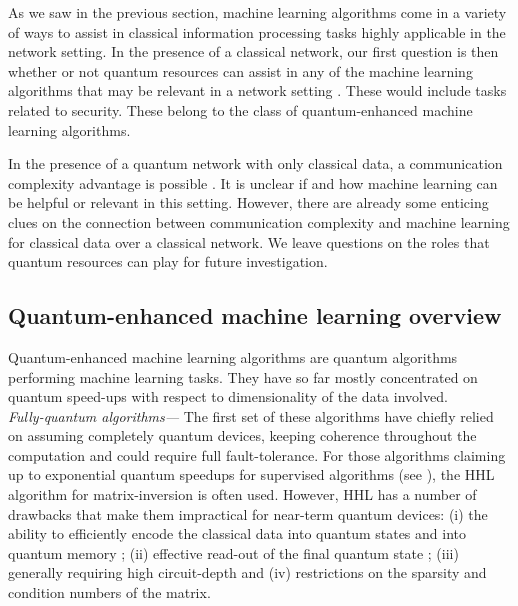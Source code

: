 \documentclass[twocolumn, aps, rmp, amsmath, amssymb, nofootinbib, superscriptaddress, longbibliography, floatfix, table-of-contents, eqsecnum]{revtex4-2}
\begin{document}
As we saw in the previous section, machine learning algorithms come in a variety of ways to assist in classical information processing tasks highly applicable in the network setting. In the presence of a classical network, our first question is then whether or not quantum resources can assist in any of the machine learning algorithms that may be relevant in a network setting . These would include tasks related to security. These belong to the class of quantum-enhanced machine learning algorithms.

In the presence of a quantum network with only classical data, a communication complexity advantage is possible \cite{brassard2003quantum}. It is unclear if and how machine learning can be helpful or relevant in this setting. However, there are already some enticing clues \cite{kane2017communication, balcan2012distributed, conitzer2004communication} on the connection between communication complexity and machine learning for classical data over a classical network. We leave questions on the roles that quantum resources can play for future investigation. 

\subsection{Quantum-enhanced machine learning overview}
Quantum-enhanced machine learning algorithms are quantum algorithms performing machine learning tasks. They have so far mostly concentrated on quantum speed-ups with respect to dimensionality of the data involved. \\

\textit{Fully-quantum algorithms---} The first set of these algorithms have chiefly relied on assuming completely quantum devices, keeping coherence throughout the computation and could require full fault-tolerance. For those algorithms claiming up to exponential quantum speedups for supervised algorithms (see \cite{biamonte2017quantum, ciliberto2018quantum}),  the HHL algorithm \cite{harrow2009quantum} for matrix-inversion is often used. However, HHL has a number of drawbacks that make them impractical for near-term quantum devices: (i) the ability to efficiently encode the classical data into quantum states and into quantum memory \cite{aaronson2015read}; (ii) effective read-out of the final quantum state \cite{aaronson2015read}; (iii) generally requiring high circuit-depth and (iv) restrictions on the sparsity and condition numbers of the matrix.
\end{document}
